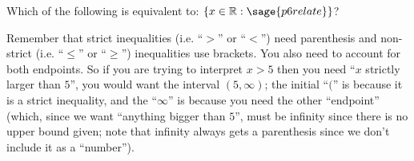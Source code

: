 \documentclass{ximera}
\begin{document}
\begin{problem}
    Which of the following is equivalent to: $\{ x \in \mathbb{R} : \sage{p6relate} \}$?
    \begin{multipleChoice}
    \end{multipleChoice}
    
    \begin{feedback}
        Remember that strict inequalities (i.e. ``$>$'' or ``$<$'') need parenthesis and non-strict (i.e. ``$\leq$'' or ``$\geq$'') inequalities use brackets. You also need to account for both endpoints. So if you are trying to interpret $x > 5$ then you need ``$x$ strictly larger than $5$'', you would want the interval $(5,\infty)$; the initial ``$($'' is because it is a strict inequality, and the ``$\infty$'' is because you need the other ``endpoint'' (which, since we want ``anything bigger than $5$'', must be infinity since there is no upper bound given; note that infinity always gets a parenthesis since we don't include it as a ``number'').
    \end{feedback}
\end{problem}
\end{document}
